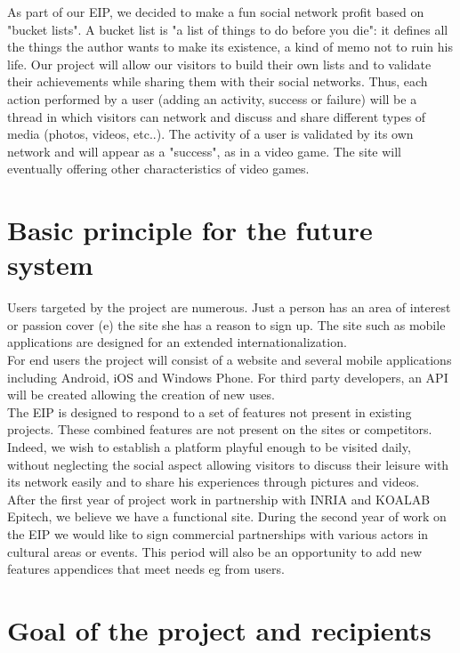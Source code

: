 \documentclass{life-fr}
\begin{document}
As part of our EIP, we decided to make a fun social network profit based on "bucket lists". A bucket list is "a list of things to do before you die": it defines all the things the author wants to make its existence, a kind of memo not to ruin his life. Our project will allow our visitors to build their own lists and to validate their achievements while sharing them with their social networks. Thus, each action performed by a user (adding an activity, success or failure) will be a thread in which visitors can network and discuss and share different types of media (photos, videos, etc..). The activity of a user is validated by its own network and will appear as a "success", as in a video game. The site will eventually offering other characteristics of video games.

\section{Basic principle for the future system}

Users targeted by the project are numerous. Just a person has an area of interest or passion cover (e) the site she has a reason to sign up. The site such as mobile applications are designed for an extended internationalization.\\

For end users the project will consist of a website and several mobile applications including Android, iOS and Windows Phone. For third party developers, an API will be created allowing the creation of new uses.\\

The EIP is designed to respond to a set of features not present in existing projects. These combined features are not present on the sites or competitors. Indeed, we wish to establish a platform playful enough to be visited daily, without neglecting the social aspect allowing visitors to discuss their leisure with its network easily and to share his experiences through pictures and videos.\\

After the first year of project work in partnership with INRIA and KOALAB Epitech, we believe we have a functional site. During the second year of work on the EIP we would like to sign commercial partnerships with various actors in cultural areas or events. This period will also be an opportunity to add new features appendices that meet needs eg from users.

\section{Goal of the project and recipients}
\end{document}

